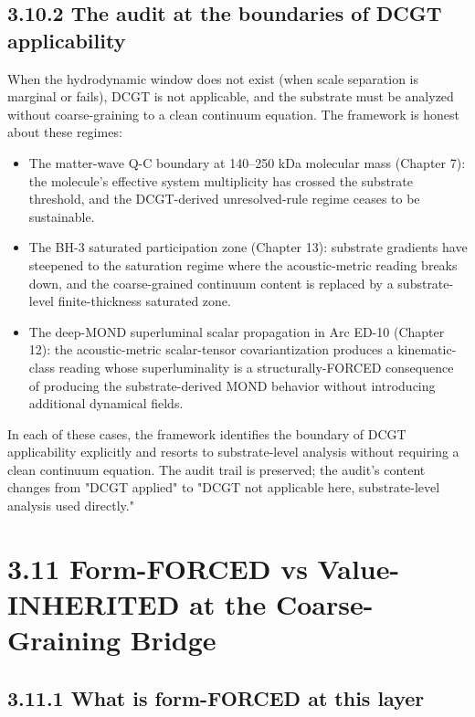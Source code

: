 \documentclass[11pt]{book}
\begin{document}
\subsection{3.10.2 The audit at the boundaries of DCGT applicability}

When the hydrodynamic window does not exist (when scale separation is marginal or fails), DCGT is not applicable, and the substrate must be analyzed without coarse-graining to a clean continuum equation. The framework is honest about these regimes:

\begin{itemize}
\item The matter-wave Q-C boundary at 140–250 kDa molecular mass (Chapter 7): the molecule's effective system multiplicity has crossed the substrate threshold, and the DCGT-derived unresolved-rule regime ceases to be sustainable.
\item The BH-3 saturated participation zone (Chapter 13): substrate gradients have steepened to the saturation regime where the acoustic-metric reading breaks down, and the coarse-grained continuum content is replaced by a substrate-level finite-thickness saturated zone.
\item The deep-MOND superluminal scalar propagation in Arc ED-10 (Chapter 12): the acoustic-metric scalar-tensor covariantization produces a kinematic-class reading whose superluminality is a structurally-FORCED consequence of producing the substrate-derived MOND behavior without introducing additional dynamical fields.
\end{itemize}

In each of these cases, the framework identifies the boundary of DCGT applicability explicitly and resorts to substrate-level analysis without requiring a clean continuum equation. The audit trail is preserved; the audit's content changes from "DCGT applied" to "DCGT not applicable here, substrate-level analysis used directly."

\section{3.11 Form-FORCED vs Value-INHERITED at the Coarse-Graining Bridge}

\subsection{3.11.1 What is form-FORCED at this layer}
\end{document}
